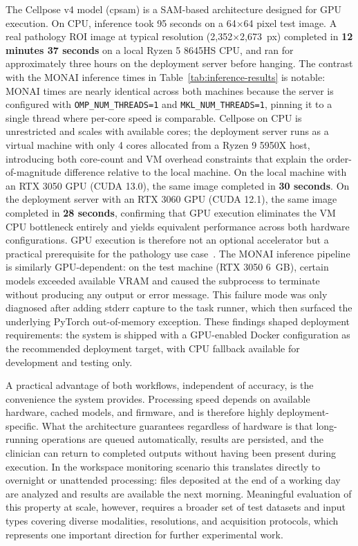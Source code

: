 \documentclass[conference]{IEEEtran}
\begin{document}
The Cellpose v4 model (cpsam) is a SAM-based architecture designed for GPU execution. On CPU, inference took 95 seconds on a 64$\times$64 pixel test image. A real pathology ROI image at typical resolution (2{,}352$\times$2{,}673~px) completed in \textbf{12 minutes 37 seconds} on a local Ryzen 5 8645HS CPU, and ran for approximately three hours on the deployment server before hanging. The contrast with the MONAI inference times in Table~\ref{tab:inference-results} is notable: MONAI times are nearly identical across both machines because the server is configured with \texttt{OMP\_NUM\_THREADS=1} and \texttt{MKL\_NUM\_THREADS=1}, pinning it to a single thread where per-core speed is comparable. Cellpose on CPU is unrestricted and scales with available cores; the deployment server runs as a virtual machine with only 4 cores allocated from a Ryzen 9 5950X host, introducing both core-count and VM overhead constraints that explain the order-of-magnitude difference relative to the local machine. On the local machine with an RTX 3050 GPU (CUDA 13.0), the same image completed in \textbf{30 seconds}.
On the deployment server with an RTX 3060 GPU (CUDA 12.1), the same image completed in \textbf{28 seconds}, confirming that GPU execution eliminates the VM CPU bottleneck entirely and yields equivalent performance across both hardware configurations. GPU execution is therefore not an optional accelerator but a practical prerequisite for the pathology use case~\cite{cellpose}. The MONAI inference pipeline is similarly GPU-dependent: on the test machine (RTX 3050 6~GB), certain models exceeded available VRAM and caused the subprocess to terminate without producing any output or error message. This failure mode was only diagnosed after adding stderr capture to the task runner, which then surfaced the underlying PyTorch out-of-memory exception. These findings shaped deployment requirements: the system is shipped with a GPU-enabled Docker configuration as the recommended deployment target, with CPU fallback available for development and testing only.

A practical advantage of both workflows, independent of accuracy, is the convenience the system provides. Processing speed depends on available hardware, cached models, and firmware, and is therefore highly deployment-specific. What the architecture guarantees regardless of hardware is that long-running operations are queued automatically, results are persisted, and the clinician can return to completed outputs without having been present during execution. In the workspace monitoring scenario this translates directly to overnight or unattended processing: files deposited at the end of a working day are analyzed and results are available the next morning.
Meaningful evaluation of this property at scale, however, requires a broader set of test datasets and input types covering diverse modalities, resolutions, and acquisition protocols, which represents one important direction for further experimental work.
\end{document}
